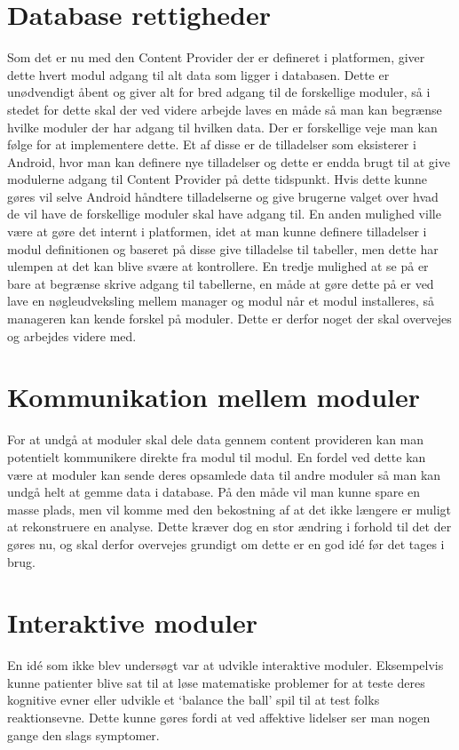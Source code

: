 \section{Database rettigheder}
Som det er nu med den Content Provider der er defineret i platformen, giver dette hvert modul adgang til alt data som ligger i databasen.
Dette er unødvendigt åbent og giver alt for bred adgang til de forskellige moduler, så i stedet for dette skal der ved videre arbejde laves en måde så man kan begrænse hvilke moduler der har adgang til hvilken data.
Der er forskellige veje man kan følge for at implementere dette.  
Et af disse er de tilladelser som eksisterer i Android, hvor man kan definere nye tilladelser og dette er endda brugt til at give modulerne adgang til Content Provider på dette tidspunkt.
Hvis dette kunne gøres vil selve Android håndtere tilladelserne og give brugerne valget over hvad de vil have de forskellige moduler skal have adgang til.
En anden mulighed ville være at gøre det internt i platformen, idet at man kunne definere tilladelser i modul definitionen og baseret på disse give tilladelse til tabeller, men dette har ulempen at det kan blive svære at kontrollere. 
En tredje mulighed at se på er bare at begrænse skrive adgang til tabellerne, en måde at gøre dette på er ved lave en nøgleudveksling mellem manager og modul når et modul installeres, så manageren kan kende forskel på moduler.
Dette er derfor noget der skal overvejes og arbejdes videre med. 

\section{Kommunikation mellem moduler}
For at undgå at moduler skal dele data gennem content provideren kan man potentielt kommunikere direkte fra modul til modul.
En fordel ved dette kan være at moduler kan sende deres opsamlede data til andre moduler så man kan undgå helt at gemme data i database.
På den måde vil man kunne spare en masse plads, men vil komme med den bekostning af at det ikke længere er muligt at rekonstruere en analyse.
Dette kræver dog en stor ændring i forhold til det der gøres nu, og skal derfor overvejes grundigt om dette er en god idé før det tages i brug.

\section{Interaktive moduler}
En idé som ikke blev undersøgt var at udvikle interaktive moduler.
Eksempelvis kunne patienter blive sat til at løse matematiske problemer for at teste deres kognitive evner eller udvikle et `balance the ball' spil til at test folks reaktionsevne.
Dette kunne gøres fordi at ved affektive lidelser ser man nogen gange den slags symptomer. 

